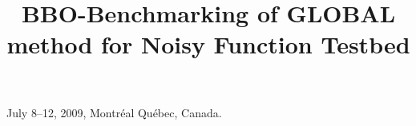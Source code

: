 \documentclass{sig-alternate}
\begin{document}
%
 {July 8--12, 2009, Montr\'eal Qu\'ebec, Canada.}

\title{BBO-Benchmarking of GLOBAL method for Noisy Function
Testbed
}
%
%
%
%
%
\end{document}
